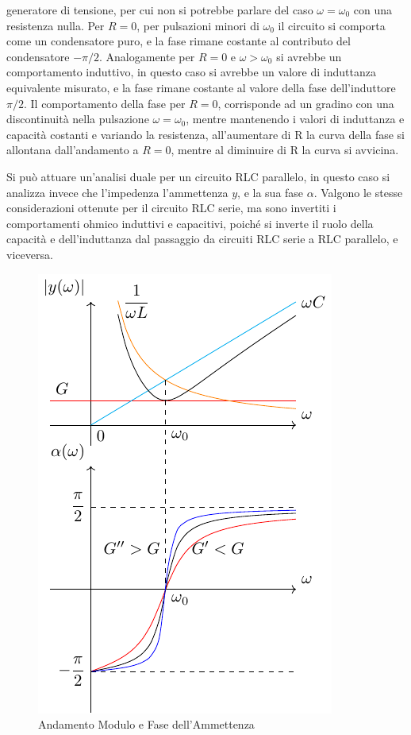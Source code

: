 \documentclass{article}
\numberwithin{equation}{subsection}
\begin{document}
generatore di tensione, per cui non si potrebbe parlare del caso $\omega=\omega_0$ con una resistenza nulla. Per $R=0$, per pulsazioni minori di $\omega_0$ il circuito 
si comporta come un condensatore puro, e la fase rimane costante al contributo del condensatore $-\pi/2$. Analogamente per $R=0$ e $\omega>\omega_0$ si avrebbe un 
comportamento induttivo, in questo caso si avrebbe un valore di induttanza equivalente misurato, e la fase rimane costante al valore della fase dell'induttore $\pi/2$. 
Il comportamento della fase per $R=0$, corrisponde ad un gradino con una discontinuità nella pulsazione $\omega=\omega_0$, mentre mantenendo i valori di induttanza e capacità 
costanti e variando la resistenza, all'aumentare di R la curva della fase si allontana dall'andamento a $R=0$, mentre al diminuire di R la curva si avvicina. 


Si può attuare un'analisi duale per un circuito RLC parallelo, in questo caso si analizza invece che l'impedenza l'ammettenza $y$, e la sua fase $\alpha$. Valgono le stesse 
considerazioni ottenute per il circuito RLC serie, ma sono invertiti i comportamenti ohmico induttivi e capacitivi, poiché si inverte il ruolo della capacità e dell'induttanza 
dal passaggio da circuiti RLC serie a RLC parallelo, e viceversa. 

\begin{figure}[H]%
    \centering
    \includegraphics{andamento-ammettenza-rlc-parallelo.pdf}
    \caption{Andamento Modulo e Fase dell'Ammettenza}
    \label{fig:andamento-ammettenza-rlc-parallelo}
\end{figure}
\end{document}

